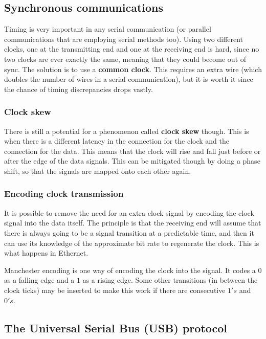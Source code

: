 \subsection{Synchronous communications}

Timing is very important in any serial communication (or parallel communications
that are employing serial methods too). Using two different clocks, one at the
transmitting end and one at the receiving end is hard, since no two clocks are
ever exactly the same, meaning that they could become out of sync. The solution
is to use a {\bf common clock}. This requires an extra wire (which doubles the
number of wires in a serial communication), but it is worth it since the chance
of timing discrepancies drops vastly.

\subsubsection{Clock skew}

There is still a potential for a phenomenon called {\bf clock skew} though. This
is when there is a different latency in the connection for the clock and the
connection for the data. This means that the clock will rise and fall just
before or after the edge of the data signals. This can be mitigated though by
doing a phase shift, so that the signals are mapped onto each other again.

\subsubsection{Encoding clock transmission}

It is possible to remove the need for an extra clock signal by encoding the
clock signal into the data itself. The principle is that the receiving end will
assume that there is always going to be a signal transition at a predictable
time, and then it can use its knowledge of the approximate bit rate to
regenerate the clock. This is what happens in Ethernet.


Manchester encoding is one way of encoding the clock into the signal. It codes a
$0$ as a falling edge and a $1$ as a rising edge. Some other transitions
(in between the clock ticks) may be inserted to make this work if there are
consecutive $1's$ and $0's$.

\subsection{The Universal Serial Bus (USB) protocol}

